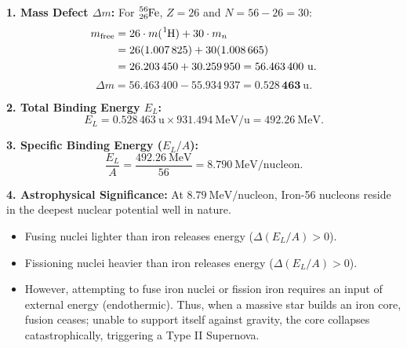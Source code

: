 \begin{solution}
\textbf{1. Mass Defect $\Delta m$:}
For $\ce{^{56}_{26}Fe}$, $Z = 26$ and $N = 56 - 26 = 30$:
\begin{align*}
m_{\text{free}} &= 26 \cdot m(\ce{^1H}) + 30 \cdot m_n \\
                &= 26(1.007\,825) + 30(1.008\,665) \\
                &= 26.203\,450 + 30.259\,950 = 56.463\,400\ \mathrm{u}.
\end{align*}
\[
\Delta m = 56.463\,400 - 55.934\,937 = \mathbf{0.528\,463\ \mathrm{u}}.
\]

\textbf{2. Total Binding Energy $E_L$:}
\[
E_L = 0.528\,463\ \mathrm{u} \times 931.494\ \mathrm{MeV/u} = \mathbf{492.26\ \mathrm{MeV}}.
\]

\textbf{3. Specific Binding Energy ($E_L/A$):}
\[
\frac{E_L}{A} = \frac{492.26\ \mathrm{MeV}}{56} = \mathbf{8.790\ \mathrm{MeV/nucleon}}.
\]

\textbf{4. Astrophysical Significance:}
At $8.79\ \mathrm{MeV/nucleon}$, Iron-56 nucleons reside in the deepest nuclear potential well in nature. 
\begin{itemize}[leftmargin=1.5em,itemsep=2pt]
  \item Fusing nuclei lighter than iron releases energy ($\Delta(E_L/A) > 0$).
  \item Fissioning nuclei heavier than iron releases energy ($\Delta(E_L/A) > 0$).
  \item However, attempting to fuse iron nuclei or fission iron requires an input of external energy (endothermic). Thus, when a massive star builds an iron core, fusion ceases; unable to support itself against gravity, the core collapses catastrophically, triggering a Type II Supernova.
\end{itemize}
\end{solution}

